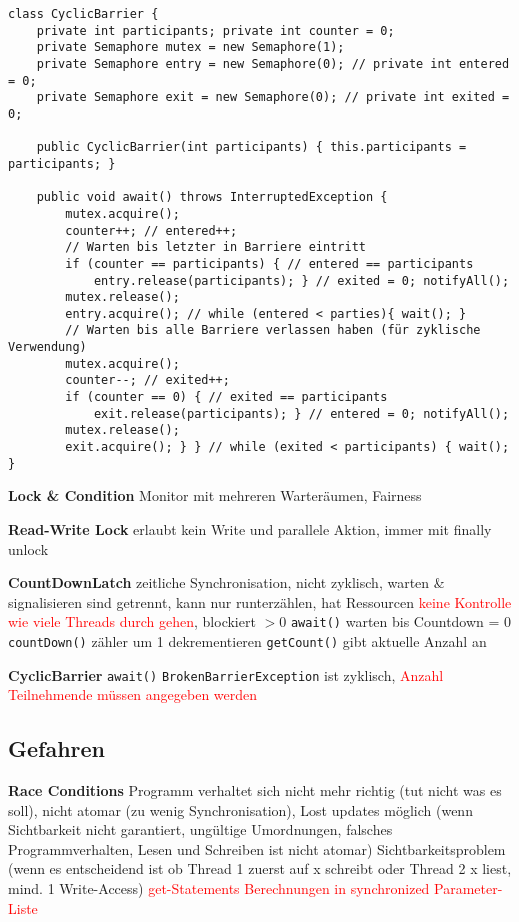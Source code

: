 \begin{lstlisting}
class CyclicBarrier {
    private int participants; private int counter = 0;
    private Semaphore mutex = new Semaphore(1);
    private Semaphore entry = new Semaphore(0); // private int entered = 0;
    private Semaphore exit = new Semaphore(0); // private int exited = 0;

    public CyclicBarrier(int participants) { this.participants = participants; }

    public void await() throws InterruptedException {
        mutex.acquire();
        counter++; // entered++;
        // Warten bis letzter in Barriere eintritt
        if (counter == participants) { // entered == participants
            entry.release(participants); } // exited = 0; notifyAll();
        mutex.release();
        entry.acquire(); // while (entered < parties){ wait(); }
        // Warten bis alle Barriere verlassen haben (für zyklische Verwendung)
        mutex.acquire();
        counter--; // exited++;
        if (counter == 0) { // exited == participants
            exit.release(participants); } // entered = 0; notifyAll();
        mutex.release();
        exit.acquire(); } } // while (exited < participants) { wait(); }
\end{lstlisting}

\textbf{Lock \& Condition} Monitor mit mehreren Warteräumen, Fairness

\textbf{Read-Write Lock} erlaubt kein Write und parallele Aktion, immer mit finally unlock

\textbf{CountDownLatch} zeitliche Synchronisation, nicht zyklisch, warten \& signalisieren sind getrennt, kann nur runterzählen, hat Ressourcen \textcolor{red}{keine Kontrolle wie viele Threads durch gehen}, blockiert $> 0$ \lstinline{await()} warten bis Countdown = 0 \lstinline{countDown()} zähler um 1 dekrementieren \lstinline{getCount()} gibt aktuelle Anzahl an

\textbf{CyclicBarrier} \lstinline{await()} \lstinline{BrokenBarrierException} ist zyklisch, \textcolor{red}{Anzahl Teilnehmende müssen angegeben werden}

\subsection{Gefahren}

\textbf{Race Conditions} Programm verhaltet sich nicht mehr richtig (tut nicht was es soll), nicht atomar (zu wenig Synchronisation), Lost updates möglich (wenn Sichtbarkeit nicht garantiert, ungültige Umordnungen, falsches Programmverhalten, Lesen und Schreiben ist nicht atomar) Sichtbarkeitsproblem (wenn es entscheidend ist ob Thread 1 zuerst auf x schreibt oder Thread 2 x liest, mind. 1 Write-Access) \textcolor{red}{get-Statements} \textcolor{red}{Berechnungen in synchronized Parameter-Liste}


